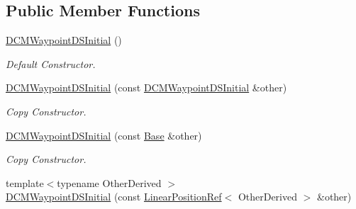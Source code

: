 \subsection*{Public Member Functions}
\begin{DoxyCompactItemize}
\item 
\hyperlink{classow__core_1_1DCMWaypointDSInitial_aafd2e590cc2cfb6ffd956ca0600cc630}{D\+C\+M\+Waypoint\+D\+S\+Initial} ()\hypertarget{classow__core_1_1DCMWaypointDSInitial_aafd2e590cc2cfb6ffd956ca0600cc630}{}\label{classow__core_1_1DCMWaypointDSInitial_aafd2e590cc2cfb6ffd956ca0600cc630}

\begin{DoxyCompactList}\small\item\em Default Constructor. \end{DoxyCompactList}\item 
\hyperlink{classow__core_1_1DCMWaypointDSInitial_a3f96f2ea1e237d6ba995196c4e466217}{D\+C\+M\+Waypoint\+D\+S\+Initial} (const \hyperlink{classow__core_1_1DCMWaypointDSInitial}{D\+C\+M\+Waypoint\+D\+S\+Initial} \&other)\hypertarget{classow__core_1_1DCMWaypointDSInitial_a3f96f2ea1e237d6ba995196c4e466217}{}\label{classow__core_1_1DCMWaypointDSInitial_a3f96f2ea1e237d6ba995196c4e466217}

\begin{DoxyCompactList}\small\item\em Copy Constructor. \end{DoxyCompactList}\item 
\hyperlink{classow__core_1_1DCMWaypointDSInitial_acad34bfb3ae4f4cb29125077560c9996}{D\+C\+M\+Waypoint\+D\+S\+Initial} (const \hyperlink{classow__core_1_1LinearPosition}{Base} \&other)\hypertarget{classow__core_1_1DCMWaypointDSInitial_acad34bfb3ae4f4cb29125077560c9996}{}\label{classow__core_1_1DCMWaypointDSInitial_acad34bfb3ae4f4cb29125077560c9996}

\begin{DoxyCompactList}\small\item\em Copy Constructor. \end{DoxyCompactList}\item 
{\footnotesize template$<$typename Other\+Derived $>$ }\\\hyperlink{classow__core_1_1DCMWaypointDSInitial_a2ab19f08cbcbfa5d3d56427ad98ac5a6}{D\+C\+M\+Waypoint\+D\+S\+Initial} (const \hyperlink{classow__core_1_1LinearPositionRef}{Linear\+Position\+Ref}$<$ Other\+Derived $>$ \&other)\hypertarget{classow__core_1_1DCMWaypointDSInitial_a2ab19f08cbcbfa5d3d56427ad98ac5a6}{}\label{classow__core_1_1DCMWaypointDSInitial_a2ab19f08cbcbfa5d3d56427ad98ac5a6}


\end{DoxyCompactItemize}
